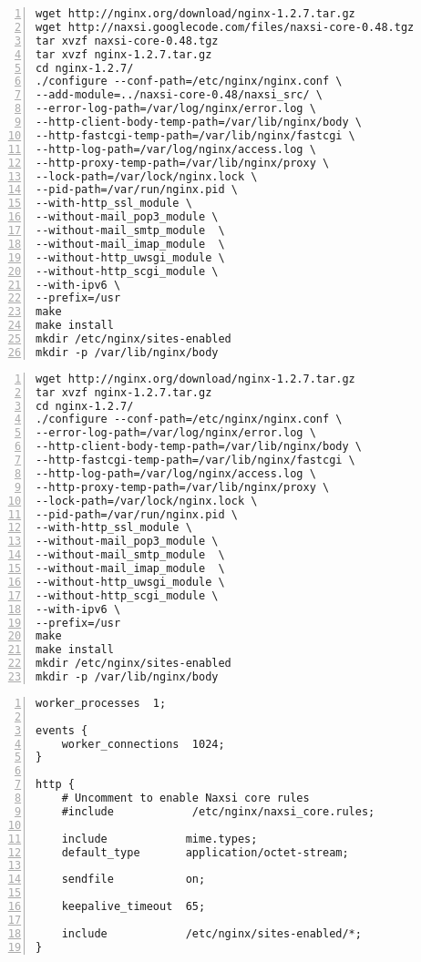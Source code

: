\documentclass[Configuration]{subfiles}
\begin{document}
\begin{lstlisting}[frame=single,caption=Compiling Nginx with Naxsi,backgroundcolor=\color{gray},breaklines=true,numbers=left,]
wget http://nginx.org/download/nginx-1.2.7.tar.gz
wget http://naxsi.googlecode.com/files/naxsi-core-0.48.tgz
tar xvzf naxsi-core-0.48.tgz
tar xvzf nginx-1.2.7.tar.gz
cd nginx-1.2.7/
./configure --conf-path=/etc/nginx/nginx.conf \
--add-module=../naxsi-core-0.48/naxsi_src/ \
--error-log-path=/var/log/nginx/error.log \
--http-client-body-temp-path=/var/lib/nginx/body \
--http-fastcgi-temp-path=/var/lib/nginx/fastcgi \
--http-log-path=/var/log/nginx/access.log \
--http-proxy-temp-path=/var/lib/nginx/proxy \
--lock-path=/var/lock/nginx.lock \
--pid-path=/var/run/nginx.pid \
--with-http_ssl_module \
--without-mail_pop3_module \
--without-mail_smtp_module  \
--without-mail_imap_module  \
--without-http_uwsgi_module \
--without-http_scgi_module \
--with-ipv6 \
--prefix=/usr
make
make install
mkdir /etc/nginx/sites-enabled
mkdir -p /var/lib/nginx/body
\end{lstlisting}

\begin{lstlisting}[frame=single,caption=Compiling Nginx without Naxsi,backgroundcolor=\color{gray},breaklines=true,numbers=left,]
wget http://nginx.org/download/nginx-1.2.7.tar.gz
tar xvzf nginx-1.2.7.tar.gz
cd nginx-1.2.7/
./configure --conf-path=/etc/nginx/nginx.conf \
--error-log-path=/var/log/nginx/error.log \
--http-client-body-temp-path=/var/lib/nginx/body \
--http-fastcgi-temp-path=/var/lib/nginx/fastcgi \
--http-log-path=/var/log/nginx/access.log \
--http-proxy-temp-path=/var/lib/nginx/proxy \
--lock-path=/var/lock/nginx.lock \
--pid-path=/var/run/nginx.pid \
--with-http_ssl_module \
--without-mail_pop3_module \
--without-mail_smtp_module  \
--without-mail_imap_module  \
--without-http_uwsgi_module \
--without-http_scgi_module \
--with-ipv6 \
--prefix=/usr
make
make install
mkdir /etc/nginx/sites-enabled
mkdir -p /var/lib/nginx/body
\end{lstlisting}

\begin{lstlisting}[frame=single,caption=/etc/nginx/nginx.conf,backgroundcolor=\color{gray},breaklines=true,numbers=left,]
worker_processes  1;

events {
    worker_connections  1024;
}

http {
    # Uncomment to enable Naxsi core rules
    #include            /etc/nginx/naxsi_core.rules;

    include            mime.types;
    default_type       application/octet-stream;

    sendfile           on;

    keepalive_timeout  65;

    include            /etc/nginx/sites-enabled/*;
}
\end{lstlisting}
\end{document}
